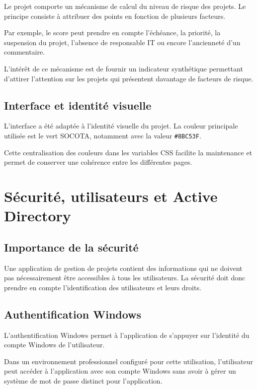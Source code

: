 \documentclass[12pt,a4paper,oneside]{report}
\begin{document}
Le projet comporte un mécanisme de calcul du niveau de risque des projets. Le principe consiste à attribuer des points en fonction de plusieurs facteurs.

Par exemple, le score peut prendre en compte l'échéance, la priorité, la suspension du projet, l'absence de responsable IT ou encore l'ancienneté d'un commentaire.

L'intérêt de ce mécanisme est de fournir un indicateur synthétique permettant d'attirer l'attention sur les projets qui présentent davantage de facteurs de risque.

\section{Interface et identité visuelle}

L'interface a été adaptée à l'identité visuelle du projet. La couleur principale utilisée est le vert SOCOTA, notamment avec la valeur \texttt{\#8BC53F}.

Cette centralisation des couleurs dans les variables CSS facilite la maintenance et permet de conserver une cohérence entre les différentes pages.

\chapter{Sécurité, utilisateurs et Active Directory}

\section{Importance de la sécurité}

Une application de gestion de projets contient des informations qui ne doivent pas nécessairement être accessibles à tous les utilisateurs. La sécurité doit donc prendre en compte l'identification des utilisateurs et leurs droits.

\section{Authentification Windows}

L'authentification Windows permet à l'application de s'appuyer sur l'identité du compte Windows de l'utilisateur.

Dans un environnement professionnel configuré pour cette utilisation, l'utilisateur peut accéder à l'application avec son compte Windows sans avoir à gérer un système de mot de passe distinct pour l'application.
\end{document}
